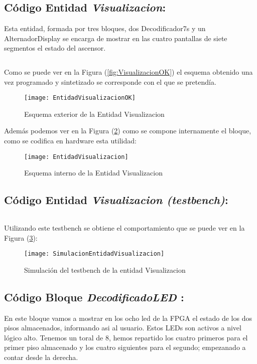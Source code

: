 \subsection{Código Entidad \textit{Visualizacion}:} \label{code:Visualizacion}

Esta entidad, formada por tres bloques, dos Decodificador7s y un AlternadorDisplay se encarga de mostrar en las cuatro pantallas de siete segmentos el estado del ascensor. \\ 
	\inputminted[frame=lines,fontsize=\footnotesize,linenos]{vhdl}{CodeFiles/EntidadVisualizacion.vhd}

	Como se puede ver en la Figura (\ref{fig:VisualizacionOK}) el esquema obtenido una vez programado y sintetizado se corresponde con el que se pretendía.
    \begin{figure}[H]
		    \centering
		    \texttt{[image: EntidadVisualizacionOK]}
		    \caption{Esquema exterior de la Entidad Visualizacion}
		    \label{fig:EntidadVisualizacionOK}
	\end{figure}
    Además podemos ver en la Figura (\ref{fig:EntidadVisualizacionImplementacion}) como se compone internamente el bloque, como se codifica en hardware esta utilidad:
    \begin{figure}[H]
		    \centering
		    \texttt{[image: EntidadVisualizacion]}
		    \caption{Esquema interno de la Entidad Visualizacion}
		    \label{fig:EntidadVisualizacionImplementacion}
	\end{figure}

\subsection{Código Entidad \textit{Visualizacion (testbench)}:} \label{code:Visualizacion_tb}
	\inputminted[frame=lines,fontsize=\footnotesize,linenos]{vhdl}{CodeFiles/EntidadVisualizacion_tb.vhd}

    Utilizando este testbench se obtiene el comportamiento que se puede ver en la Figura (\ref{fig:SimulacionEntidadVisualizacion}):

    \begin{figure}[H]
		    \centering
		    \texttt{[image: SimulacionEntidadVisualizacion]}
		    \caption{Simulación del testbench de la entidad Visualizacion}
		    \label{fig:SimulacionEntidadVisualizacion}
	\end{figure}

\subsection {Código Bloque \textit{DecodificadoLED} :} \label{code:DecodificadorLED}
	En este bloque vamos a mostrar en los ocho led de la FPGA el estado de los dos pisos almacenados, informando asi al usuario. Estos LEDs son activos a nivel lógico alto. Tenemos un toral de 8, hemos repartido los cuatro primeros para el primer piso almacenado y los cuatro siguientes para el segundo; empezanado a contar desde la derecha.
	\inputminted[frame=lines,fontsize=\footnotesize,linenos]{vhdl}{CodeFiles/DecodificadorLED.vhd}

